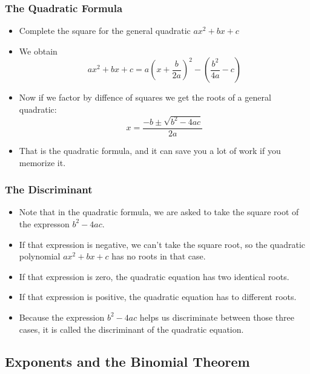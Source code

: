 \documentclass[serif,ignorenonframetext]{beamer}
\begin{document}
\begin{frame}
  \frametitle{The Quadratic Formula}
  \begin{itemize}[<+->]
  \item Complete the square for the general quadratic $ax^2+bx+c$
  \item We obtain 
    \begin{equation*}
      ax^2+bx+c 
      = a\left(x +\frac{b}{2a}\right)^2 -
      \left(\frac{b^2}{4a}-c\right)
    \end{equation*}
  \item Now if we factor by diffence of squares we get the roots of a
    general quadratic:
    \begin{equation*}
      x = \frac{-b\pm \sqrt{b^2-4ac}}{2a}
    \end{equation*}
  \item That is the quadratic formula, and it can save you a lot of
    work if you memorize it.
  \end{itemize}
\end{frame}

\begin{frame}
  \frametitle{The Discriminant}
  \begin{itemize}[<+->]
  \item Note that in the quadratic formula, we are asked to take the
    square root of the expresson $b^2-4ac$.
  \item If that expression is negative, we can't take the square root,
    so the quadratic polynomial $ax^2+bx+c$ has no roots in that case.
  \item If that expression is zero, the quadratic equation has two
    identical roots.
  \item If that expression is positive, the quadratic equation has to
    different roots.
  \item Because the expression $b^2-4ac$ helps us discriminate between
    those three cases, it is called the discriminant of the quadratic
    equation. 
  \end{itemize}
\end{frame}

\subsection{Exponents and the Binomial Theorem}
\end{document}
